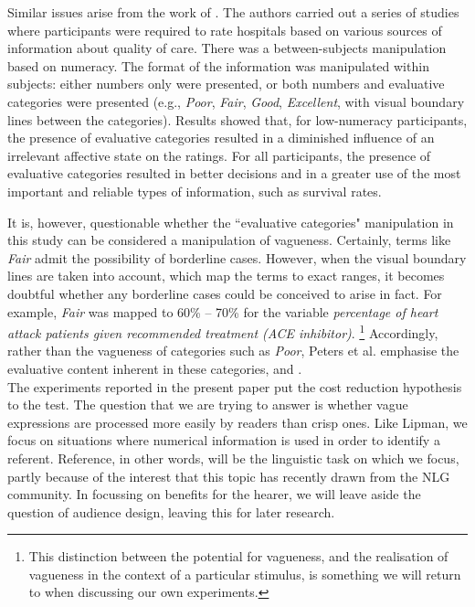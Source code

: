 \documentclass[doc,apacite]{apa6}
\begin{document}
Similar issues arise from the work of . The authors carried out a series of studies where participants were required to rate hospitals based on various sources of information about quality of care. There was a between-subjects manipulation based on numeracy. The format of the information was manipulated within subjects: either numbers only were presented, or both numbers and evaluative categories were presented (e.g., \emph{Poor}, \emph{Fair}, \emph{Good}, \emph{Excellent}, with  visual boundary lines between the categories). Results showed that, for low-numeracy participants, the presence of evaluative categories resulted in a diminished influence of an irrelevant affective state on the ratings. For all participants, the presence of evaluative categories resulted in better decisions and in a greater use of the most important and reliable types of information, such as survival rates. 

It is, however, questionable whether the ``evaluative categories" manipulation in this study can be considered a manipulation of vagueness. Certainly, terms like \emph{Fair} admit the possibility of borderline cases. However,  {when the visual boundary lines are taken into account, which map the terms to exact ranges}, it becomes doubtful whether any borderline cases could be conceived to arise in fact. For example, \emph{Fair} was mapped to 60\% -- 70\% for the variable \emph{percentage of heart attack patients given recommended treatment (ACE inhibitor)}. {\deleted\footnote{This distinction between the potential for vagueness, and the realisation of vagueness in the context of a particular stimulus, is something we will return to when discussing our own experiments.}} Accordingly, rather than the vagueness of categories such as \emph{Poor}, Peters et al. emphasise the evaluative content inherent in these categories, and .\\[2ex]
%
The experiments reported in the present paper put the cost reduction hypothesis to the test. The question that we are trying to answer is whether vague expressions are processed more easily by readers than crisp ones. Like Lipman, we focus on situations where numerical information is used in order to identify a referent. Reference, in other words, will be the linguistic task on which we focus, partly because of the interest that this topic has recently drawn from the NLG community.  In focussing on benefits for the hearer, we will leave aside the question of audience design, leaving this for later research.
\end{document}

